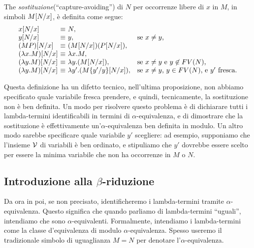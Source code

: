 \documentclass{article}
\begin{document}
\begin{definition}
  The {\em sostituzione}(``capture-avoiding'')  di $N$ per occorrenze
  libere di $x$ in $M$, in simboli $M[N/x]$, \`e definita
  come segue:
  \[  \begin{array}{l@{~}l@{~}ll}
    \subst{x}{N}{x} &\equiv & N, \\
    \subst{y}{N}{x} &\equiv & y, &\mbox{se $x\neq y$,} \\
    \subst{(MP)}{N}{x} &\equiv & (\subst{M}{N}{x})(\subst{P}{N}{x}), \\
    \subst{(\lam x.M)}{N}{x} &\equiv & \lam x.M, \\
    \subst{(\lam y.M)}{N}{x} &\equiv & \lam y.(\subst{M}{N}{x}), 
    &\mbox{se $x\neq y$ e $y\not\in\FV{N}$,} \\
    \subst{(\lam y.M)}{N}{x} &\equiv & \lam y'.(\subst{\ren{M}{y'}{y}}{N}{x}), 
    &\mbox{se $x\neq y$, $y\in\FV{N}$, e $y'$ fresca.} \\
  \end{array}
  \]
\end{definition}

Questa definizione ha un difetto tecnico, nell'ultima proposizione, non
abbiamo specificato quale variabile fresca prendere, e quindi, tecnicamente,
la sostituzione non \`e ben definita. Un modo per risolvere questo problema
\`e di dichiarare tutti i lambda-termini identificabili in termini di
$\alpha$-equivalenza, e di dimostrare che la sostituzione \`e effettivamente
un'$\alpha$-equivalenza ben definita in modulo. Un altro modo sarebbe
specificare quale variabile $y'$ scegliere: ad esempio, supponiamo che
l'insieme ${\cal V}$ di variabili \`e ben ordinato, e stipuliamo che $y'$ dovrebbe
essere scelto per essere la minima variabile che non ha occorrenze in $M$ o $N$.

\subsection{Introduzione alla $\beta$-riduzione}

\begin{convention}
Da ora in poi, se non precisato, identificheremo i lambda-termini tramite
$\alpha$-equivalenza. Questo significa che quando parliamo di lambda-termini
``uguali'', intendiamo che sono $\alpha$-equivalenti. Formalmente, intendiamo
i lambda-termini come la classe d'equivalenza di modulo $\alpha$-equivalenza.
Spesso useremo il tradizionale simbolo di uguaglianza $M=N$ per denotare
l'$\alpha$-equivalenza.
\end{convention}
\end{document}
